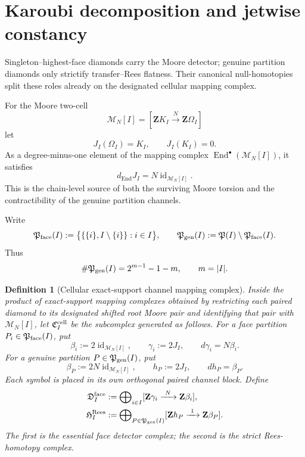 \documentclass[11pt]{article}
\newtheorem{definition}[theorem]{Definition}
\theoremstyle{remark}
\newcommand{\Z}{\mathbf Z}
\begin{document}
\section{Karoubi decomposition and jetwise constancy}

Singleton--highest-face diamonds carry the Moore detector; genuine
partition diamonds only strictify transfer--Rees flatness.  Their canonical
null-homotopies split these roles already on the designated cellular mapping
complex.

For the Moore two-cell
\[
 \mathcal M_N[I]=[\Z K_I\xrightarrow{N}\Z\Omega_I]
\]
let
\begin{equation}
 \boxed{
 J_I(\Omega_I)=K_I,\qquad J_I(K_I)=0.}
\end{equation}
As a degree-minus-one element of the mapping complex
\(\operatorname{End}^\bullet(\mathcal M_N[I])\), it satisfies
\begin{equation}\label{P2M-eq:universal-moore-homotopy-diff}
 \boxed{d_{\operatorname{End}}J_I=N\operatorname{id}_{\mathcal M_N[I]}.}
\end{equation}
This is the chain-level source of both the surviving Moore torsion and the
contractibility of the genuine partition channels.

Write
\[
 \mathfrak P_{\rm face}(I)
 :=\bigl\{\{\{i\},I\setminus\{i\}\}:i\in I\bigr\},
 \qquad
 \mathfrak P_{\rm gen}(I)
 :=\mathfrak P(I)\setminus\mathfrak P_{\rm face}(I).
\]
Thus
\begin{equation}
 \#\mathfrak P_{\rm gen}(I)=2^{m-1}-1-m,
 \qquad m=|I|.
\end{equation}

\begin{definition}[Cellular exact-support channel mapping complex]
\label{P2M-def:cellular-channel-mapping-complex}
Inside the product of exact-support mapping complexes obtained by restricting
each paired diamond to its designated shifted root Moore pair and identifying
that pair with \(\mathcal M_N[I]\), let
\(\mathfrak C_I^{\rm cell}\) be the subcomplex generated as follows.
For a face partition \(P_i\in\mathfrak P_{\rm face}(I)\), put
\[
 \beta_i:=2\operatorname{id}_{\mathcal M_N[I]},
 \qquad
 \gamma_i:=2J_I,
 \qquad
 d\gamma_i=N\beta_i.
\]
For a genuine partition \(P\in\mathfrak P_{\rm gen}(I)\), put
\[
 \beta_P:=2N\operatorname{id}_{\mathcal M_N[I]},
 \qquad
 h_P:=2J_I,
 \qquad
 dh_P=\beta_P.
\]
Each symbol is placed in its own orthogonal paired channel block.  Define
\begin{align}
 \mathfrak D_I^{\rm face}
 &:={\bigoplus}_{i\in I}
       [\Z\gamma_i\xrightarrow{\ N\ }\Z\beta_i],
 \\
 \mathfrak H_I^{\rm Rees}
 &:={\bigoplus}_{P\in\mathfrak P_{\rm gen}(I)}
       [\Z h_P\xrightarrow{\ 1\ }\Z\beta_P].
\end{align}
The first is the \emph{essential face detector complex}; the second is the
\emph{strict Rees-homotopy complex}.
\end{definition}
\end{document}
